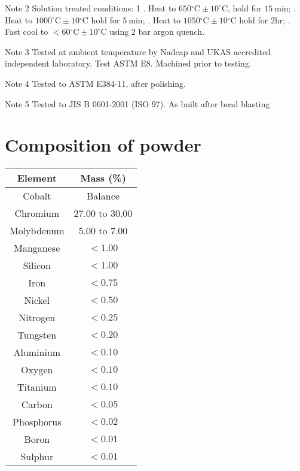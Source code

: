 \documentclass[10pt]{article}
\begin{document}
Note 2 Solution treated conditions: 1 . Heat to $650{ }^{\circ} \mathrm{C} \pm 10^{\circ} \mathrm{C}$, hold for $15 \mathrm{~min}$; . Heat to $1000^{\circ} \mathrm{C} \pm 10{ }^{\circ} \mathrm{C}$ hold for $5 \mathrm{~min}$; . Heat to $1050{ }^{\circ} \mathrm{C} \pm 10{ }^{\circ} \mathrm{C}$ hold for $2 \mathrm{hr}$; . Fast cool to $<60^{\circ} \mathrm{C} \pm 10^{\circ} \mathrm{C}$ using 2 bar argon quench.

Note 3 Tested at ambient temperature by Nadcap and UKAS accredited independent laboratory. Test ASTM E8. Machined prior to testing.

Note 4 Tested to ASTM E384-11, after polishing.

Note 5 Tested to JIS B 0601-2001 (ISO 97). As built after bead blasting

\section*{Composition of powder}
\begin{center}
\begin{tabular}{|c|c|}
\hline
Element & Mass (\%) \\
\hline
Cobalt & Balance \\
\hline
Chromium & 27.00 to 30.00 \\
\hline
Molybdenum & 5.00 to 7.00 \\
\hline
Manganese & $<1.00$ \\
\hline
Silicon & $<1.00$ \\
\hline
Iron & $<0.75$ \\
\hline
Nickel & $<0.50$ \\
\hline
Nitrogen & $<0.25$ \\
\hline
Tungsten & $<0.20$ \\
\hline
Aluminium & $<0.10$ \\
\hline
Oxygen & $<0.10$ \\
\hline
Titanium & $<0.10$ \\
\hline
Carbon & $<0.05$ \\
\hline
Phosphorus & $<0.02$ \\
\hline
Boron & $<0.01$ \\
\hline
Sulphur & $<0.01$ \\
\hline
\end{tabular}
\end{center}
\end{document}
